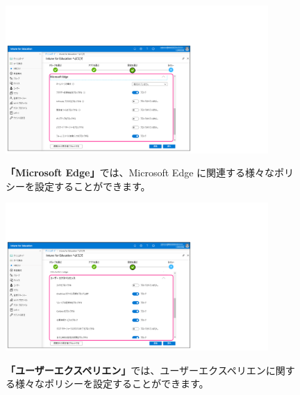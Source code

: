 \begin{figure}[h]
    \begin{minipage}{0.6\textwidth}
        \vspace{-1cm}
        \includegraphics[width=10cm]{figures/Setup-Intune-11.png}
    \end{minipage}
    \begin{minipage}{0.4\textwidth}
       \textbf{「Microsoft Edge」}では、Microsoft Edge に関連する様々なポリシーを設定することができます。
    \end{minipage}
\end{figure}

\begin{figure}[h]
    \begin{minipage}{0.6\textwidth}
        \vspace{-1cm}
        \includegraphics[width=10cm]{figures/Setup-Intune-12.png}
    \end{minipage}
    \begin{minipage}{0.4\textwidth}
       \textbf{「ユーザーエクスペリエン」}では、ユーザーエクスペリエンに関する様々なポリシーを設定することができます。
    \end{minipage}
\end{figure}

